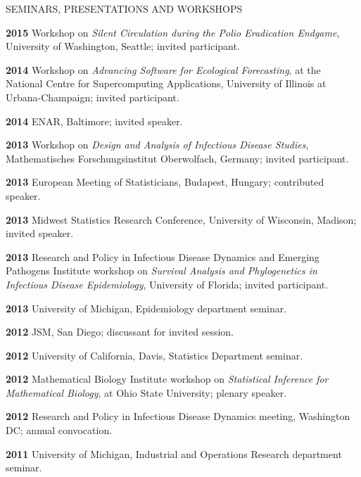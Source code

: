 \begin{mylist}{SEMINARS, PRESENTATIONS AND WORKSHOPS}
\item{\bf 2015 } Workshop on {\it Silent Circulation during the Polio Eradication Endgame}, University of Washington, Seattle; invited participant. 

\item{\bf 2014 } Workshop on {\it Advancing Software for Ecological Forecasting}, at the National Centre for Supercomputing Applications, University of Illinois at Urbana-Champaign; invited participant.

\item{\bf 2014 } ENAR, Baltimore; invited speaker.

\item{\bf 2013 }  Workshop on {\it Design and Analysis of Infectious Disease Studies}, Mathematisches Forschungsinstitut Oberwolfach, Germany; invited participant.

\item{\bf 2013 } European Meeting of Statisticians, Budapest, Hungary; contributed speaker.

\item{\bf 2013 } Midwest Statistics Research Conference, University of Wisconsin, Madison;  invited speaker.

\item{\bf 2013 }  Research and Policy in Infectious Disease Dynamics and Emerging Pathogens Institute workshop on {\it Survival Analysis and Phylogenetics in Infectious Disease Epidemiology}, University of Florida; invited participant.

\item{\bf 2013 } University of Michigan, Epidemiology department seminar.

\item{\bf 2012 } JSM, San Diego; discussant for invited session.

\item{\bf 2012 } University of California, Davis, Statistics Department seminar.

\item{\bf 2012 } Mathematical Biology Institute workshop on {\it Statistical Inference for Mathematical Biology}, at Ohio State University; plenary speaker.

\item{\bf 2012 } Research and Policy in Infectious Disease Dynamics meeting, Washington DC; annual convocation.

\item{\bf 2011 } University of Michigan, Industrial and Operations Research department seminar.


\end{mylist}
